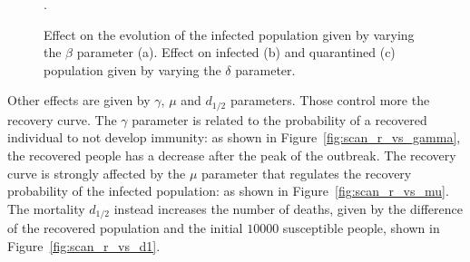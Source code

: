 \begin{figure}[!ht]\centering
{}
\caption{Effect on the evolution of the infected population given by varying the $\beta$ parameter (a). Effect on infected (b) and quarantined (c) population given by varying the $\delta$ parameter.}.
\end{figure}

Other effects are given by $\gamma$, $\mu$ and $d_{1/2}$ parameters. Those control more the recovery curve. The $\gamma$ parameter is related to the probability of a recovered individual to not develop immunity: as shown in Figure~\ref{fig:scan_r_vs_gamma}, the recovered people has a decrease after the peak of the outbreak. The recovery curve is strongly affected by the $\mu$ parameter that regulates the recovery probability of the infected population: as shown in Figure~\ref{fig:scan_r_vs_mu}. The mortality $d_{1/2}$ instead increases the number of deaths, given by the difference of the recovered population and the initial $10000$ susceptible people, shown in Figure~\ref{fig:scan_r_vs_d1}.


